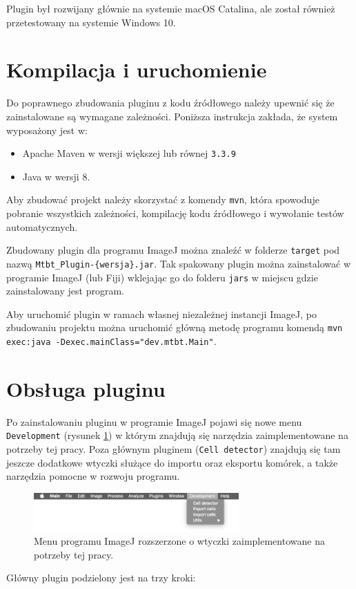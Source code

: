 \documentclass[declaration,shortabstract,mgr]{iithesis}
\begin{document}
Plugin był rozwijany głównie na systemie macOS Catalina, ale został również przetestowany na systemie Windows 10. 

\section{Kompilacja i uruchomienie}

Do poprawnego zbudowania pluginu z kodu źródłowego należy upewnić się że zainstalowane są wymagane zależności. Poniższa instrukcja zakłada, że system wyposażony jest w:

\begin{itemize}
  \item Apache Maven w wersji większej lub równej \texttt{3.3.9}
  \item Java w wersji 8.
\end{itemize}

Aby zbudować projekt należy skorzystać z komendy \texttt{mvn}, która spowoduje pobranie wszystkich zależności,  kompilację kodu źródłowego i wywołanie testów automatycznych.

Zbudowany plugin dla programu ImageJ można znaleźć w folderze \texttt{target} pod nazwą \texttt{Mtbt\_Plugin-\{wersja\}.jar}. Tak spakowany plugin można zainstalować w programie ImageJ (lub Fiji) wklejając go do folderu \texttt{jars} w miejscu gdzie zainstalowany jest program.

Aby uruchomić plugin w ramach własnej niezależnej instancji ImageJ, po zbudowaniu projektu można uruchomić główną metodę programu komendą
\linebreak\texttt{mvn exec:java -Dexec.mainClass="dev.mtbt.Main"}.


\section{Obsługa pluginu}
\label{sec:user-manual}

Po zainstalowaniu pluginu w programie ImageJ pojawi się nowe menu \texttt{Development} (rysunek \ref{fig:ui-menu}) w którym znajdują się narzędzia zaimplementowane na potrzeby tej pracy. Poza głównym pluginem (\texttt{Cell detector}) znajdują się tam jeszcze dodatkowe wtyczki służące do importu oraz eksportu komórek, a także narzędzia pomocne w rozwoju programu.
\begin{figure}
  \centering
  \includegraphics[width=0.7\textwidth]{images/ui-menu.png}
  \caption{Menu programu ImageJ rozszerzone o wtyczki zaimplementowane na potrzeby tej pracy.}
  \label{fig:ui-menu}
\end{figure}
Główny plugin podzielony jest na trzy kroki:
\end{document}
